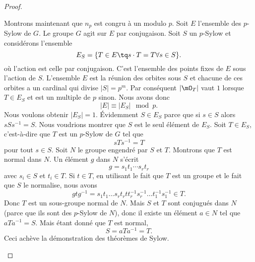 \begin{proof}
\begin{enumerate}
            Montrons maintenant que \( n_p\) est congru à un modulo \( p\). Soit \( E\) l'ensemble des $p$-Sylow de \( G\). Le groupe \( G\) agit sur \( E\) par conjugaison. Soit \( S\) un $p$-Sylow et considérons l'ensemble
            \begin{equation}
                E_S=\{ T\in E\tq s\cdot T=T\forall s\in S \}.
            \end{equation}
            où l'action est celle par conjugaison. C'est l'ensemble des points fixes de \( E\) sous l'action de \( S\). L'ensemble \( E\) est la réunion des orbites sous \( S\) et chacune de ces orbites a un cardinal qui divise \( | S |=p^m\). Par conséquent \( | \mO_T |\) vaut \( 1\) lorsque \( T\in E_S\) et est un multiple de \( p\) sinon. Nous avons donc
            \begin{equation}
                | E |\equiv | E_S |\mod p.
            \end{equation}
            Nous voulons obtenir \( | E_S |=1\). Évidemment \( S\in E_S\) parce que si \( s\in S\) alors \( sSs^{-1}=S\). Nous voudrions montrer que \( S\) est le seul élément de \( E_S\). Soit \( T\in E_S\), c'est-à-dire que \( T\) est un $p$-Sylow de \( G\) tel que
            \begin{equation}
                sTs^{-1}=T
            \end{equation}
            pour tout \( s\in S\). Soit \( N\) le groupe engendré par \( S\) et \( T\). Montrons que \( T\) est normal dans \( N\). Un élément \( g\) dans \( N\) s'écrit
            \begin{equation}
                g=s_1t_1\cdots s_rt_r
            \end{equation}
            avec \( s_i\in S\) et \( t_i\in T\). Si \( t\in T\), en utilisant le fait que \( T\) est un groupe et le fait que \( S\) le normalise, nous avons
            \begin{equation}
                gtg^{-1}=s_1t_1\ldots s_rt_rtt_r^{-1}s_r^{-1}\ldots t_1^{-1}s_1^{-1}\in T.
            \end{equation}
            Donc \( T\) est un sous-groupe normal de \( N\). Mais \( S\) et \( T\) sont conjugués dans \( N\) (parce que ils sont des $p$-Sylow de \( N\)), donc il existe un élément \( a\in N\) tel que \( aTa^{-1}=S\). Mais étant donné que \( T\) est normal,
            \begin{equation}
                S=aTa^{-1}=T.
            \end{equation}
            Ceci achève la démonstration des théorèmes de Sylow.

    \end{enumerate}
\end{proof}

